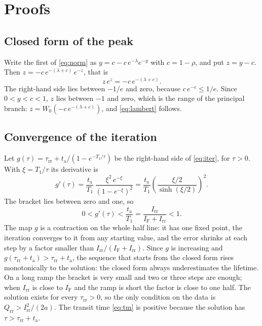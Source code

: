\documentclass[10pt,a4paper]{scrartcl}
\newcommand{\IF}{I_\mathrm{F}}
\newcommand{\Irr}{I_\mathrm{rr}}
\newcommand{\Qrr}{Q_\mathrm{rr}}
\newcommand{\ta}{t_\mathrm{a}}
\newcommand{\taurr}{\tau_\mathrm{rr}}
\newcommand{\Tone}{T_1}
\begin{document}
\section{Proofs}
\label{app:proofs}
\subsection{Closed form of the peak}
\label{app:lambert}
Write the first of \eqref{eq:norm} as $y = c - c\,e^{-\lambda}e^{-y}$ with $c = 1-\rho$, and put $z = y - c$. Then $z = -c\,e^{-(\lambda+c)}\,e^{-z}$, that is
\begin{equation}
z\,e^{z} = -c\,e^{-(\lambda+c)} .
\end{equation}
The right-hand side lies between $-1/e$ and zero, because $c\,e^{-c} \leq 1/e$. Since $0 < y < c < 1$, $z$ lies between $-1$ and zero, which is the range of the principal branch: $z = W_0(-c\,e^{-(\lambda+c)})$, and \eqref{eq:lambert} follows.

\subsection{Convergence of the iteration}
\label{app:contraction}
Let $g(\tau) = \taurr + \ta/(1-e^{-\Tone/\tau})$ be the right-hand side of \eqref{eq:iter}, for $\tau > 0$. With $\xi = \Tone/\tau$ its derivative is
\begin{equation}
g'(\tau) = \frac{\ta}{\Tone}\,\frac{\xi^2\,e^{-\xi}}{(1-e^{-\xi})^2} = \frac{\ta}{\Tone}\left(\frac{\xi/2}{\sinh(\xi/2)}\right)^{2} .
\end{equation}
The bracket lies between zero and one, so
\begin{equation}
0 < g'(\tau) < \frac{\ta}{\Tone} = \frac{\Irr}{\IF+\Irr} < 1 .
\end{equation}
The map $g$ is a contraction on the whole half line: it has one fixed point, the iteration converges to it from any starting value, and the error shrinks at each step by a factor smaller than $\Irr/(\IF+\Irr)$. Since $g$ is increasing and $g(\taurr+\ta) > \taurr+\ta$, the sequence that starts from the closed form rises monotonically to the solution: the closed form always underestimates the lifetime. On a long ramp the bracket is very small and two or three steps are enough; when $\Irr$ is close to $\IF$ and the ramp is short the factor is close to one half. The solution exists for every $\taurr > 0$, so the only condition on the data is $\Qrr > \Irr^2/(2a)$. The transit time \eqref{eq:tm} is positive because the solution has $\tau > \taurr + \ta$.
\end{document}
